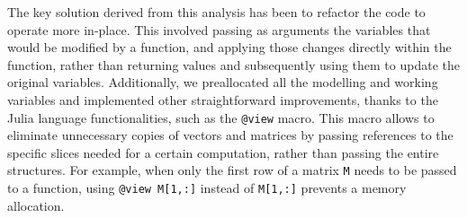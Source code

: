 \documentclass[12pt,	%
	a4paper,		%
	twoside,		%
	openright,		%
	titlepage,%
	]{book}
\theoremstyle{definition}
\newcommand{\mjline}[1]{\texttt{#1}}
\begin{document}
The key solution derived from this analysis has been to refactor the code to operate more in-place. This involved passing as arguments the variables that would be modified by a function, and applying those changes directly within the function, rather than returning values and subsequently using them to update the original variables. Additionally, we preallocated all the modelling and working variables and implemented other straightforward improvements, thanks to the Julia language functionalities, such as the \mjline{@view} macro. This macro allows to eliminate unnecessary copies of vectors and matrices by passing references to the specific slices needed for a certain computation, rather than passing the entire structures. For example, when only the first row of a matrix \mjline{M} needs to be passed to a function, using \mjline{@view M[1,:]} instead of \mjline{M[1,:]} prevents a memory allocation. 
\end{document}
